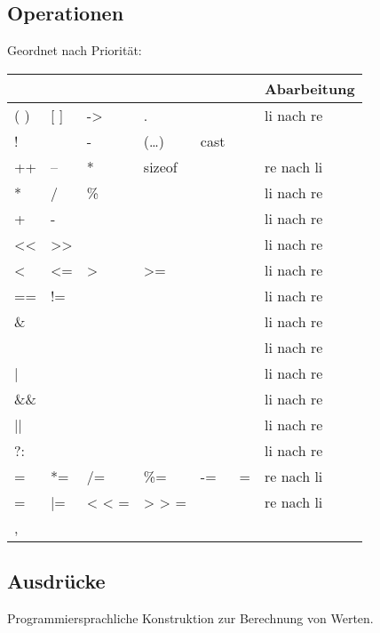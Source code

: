 \subsection{Operationen}
Geordnet nach Priorität:\\
\begin{tabular}{l l l l l l | l}
&&&&&&Abarbeitung\\
\hline
( )&[ ]&->&.&&&li nach re\\
!&~&-&(…)& cast&&\\
++&--&*&sizeof&&&re nach li\\
*&/&\%&&&&li nach re\\
+&-&&&&&li nach re\\
<<&>>&&&&&li nach re\\
<&<=&>&>=&&&li nach re\\
==&!=&&&&&li nach re\\
\& &&&&&&li nach re\\
$\hat{}$&&&&&&li nach re\\
|&&&&&&li nach re\\
\&\& &&&&&&li nach re\\
||&&&&&&li nach re\\
?: &&&&&&li nach re\\
=&*=&/=&\%=&-=&=&re nach li\\
$\hat{}$=&|=& < < = & > > = &&& re nach li\\
,&&&&&&\\
\end{tabular}


\subsection{Ausdrücke}
Programmiersprachliche Konstruktion zur Berechnung von Werten.

